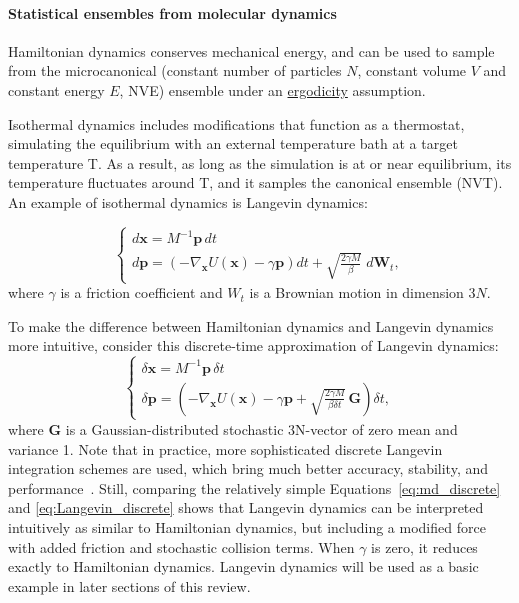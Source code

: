 \documentclass[9pt,review]{livecoms}
\newcommand{\vx}{\mathbf{x}}
\newcommand{\vp}{\mathbf{p}}
\begin{document}
\hypertarget{ref:Ensemble} {\paragraph{Statistical ensembles from molecular dynamics}}
Hamiltonian dynamics conserves mechanical energy, and can be used to sample from the microcanonical (constant number of particles $N$, constant volume $V$ and constant energy $E$, NVE) ensemble under an \hyperlink{ref:ergodic} {ergodicity} assumption.

Isothermal dynamics includes modifications that function as a thermostat, simulating the equilibrium with an external temperature bath at a target temperature T.
As a result, as long as the simulation is at or near equilibrium, its temperature fluctuates around T, and it samples the canonical ensemble (NVT).
An example of isothermal dynamics is \hypertarget{ref:Langevin} {Langevin dynamics}:

\begin{equation}
\left\{
\begin{array}{ll}
    d\vx = M^{-1} \vp \,  dt \\
    d\vp = \left(-\nabla_\vx U(\vx) - \gamma \vp \right) dt
    + \sqrt{ \frac{2 \gamma M}{\beta}} \; d\mathbf{W}_t,
\end{array}
\right.
\end{equation}
where $\gamma$ is a friction coefficient and ${W}_t$ is a Brownian motion in dimension $3N$.

To make the difference between Hamiltonian dynamics and Langevin dynamics more intuitive, consider this discrete-time approximation of Langevin dynamics:
\begin{equation}
\left\{
\begin{array}{ll}
    \delta\vx = M^{-1} \vp \, \delta t \\
    \delta\vp = \left(-\nabla_\vx U(\vx) - \gamma \vp + \sqrt{ \frac{2 \gamma M}{ \beta \delta t}} \, \mathbf{G} \right) \delta t,
    \label{eq:Langevin_discrete}
\end{array}
\right.
\end{equation}
where $\mathbf{G}$ is a Gaussian-distributed stochastic 3N-vector of zero mean and variance 1.
Note that in practice, more sophisticated discrete Langevin integration schemes are used, which bring much better accuracy, stability, and performance~\cite{Skeel2002, Leimkuhler2012}.
Still, comparing the relatively simple Equations~\ref{eq:md_discrete} and \ref{eq:Langevin_discrete} shows that Langevin dynamics can be interpreted intuitively as similar to Hamiltonian dynamics, but including a modified force with added friction and stochastic collision terms. When $\gamma$ is zero, it reduces exactly to Hamiltonian dynamics.
Langevin dynamics will be used as a basic example in later sections of this review.
\end{document}
